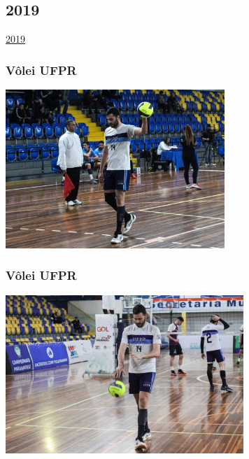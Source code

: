 \documentclass[10pt,
  aspectratio=169,
  serif,
  mathserif,
  professionalfont,
  compress,
  handout,
  ]{beamer}\usepackage[]{graphicx}\usepackage[]{color}
\begin{document}

\subsection{2019}

\begin{frame}[c, allowframebreaks]

\begin{center}

  {\huge \href{https://lineu96.github.io/st/}{2019}}
  
\end{center}

\end{frame}


\begin{frame}

\frametitle{Vôlei UFPR}

\begin{center}
  \includegraphics[height=6cm]{img/volei3.jpg}
\end{center}

\end{frame}


\begin{frame}

\frametitle{Vôlei UFPR}

\begin{center}
  \includegraphics[height=6cm]{img/volei2.jpg}
\end{center}

\end{frame}
\end{document}
